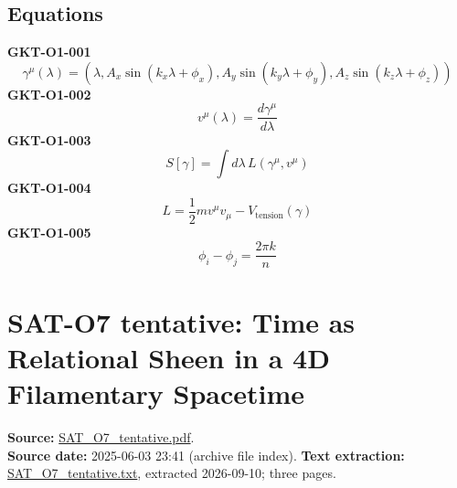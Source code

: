 \documentclass[10pt]{article}
\begin{document}
\subsection*{Equations}
\textbf{GKT-O1-001}
\begin{equation*}
\gamma^\mu(\lambda)=\left(\lambda, A_x\sin(k_x\lambda+\phi_x), A_y\sin(k_y\lambda+\phi_y), A_z\sin(k_z\lambda+\phi_z)\right)
\end{equation*}
\textbf{GKT-O1-002}
\begin{equation*}
v^\mu(\lambda)=\frac{d\gamma^\mu}{d\lambda}
\end{equation*}
\textbf{GKT-O1-003}
\begin{equation*}
S[\gamma]=\int d\lambda\,L(\gamma^\mu,v^\mu)
\end{equation*}
\textbf{GKT-O1-004}
\begin{equation*}
L=\frac{1}{2}m v^\mu v_\mu-V_{\text{tension}}(\gamma)
\end{equation*}
\textbf{GKT-O1-005}
\begin{equation*}
\phi_i-\phi_j=\frac{2\pi k}{n}
\end{equation*}

\clearpage
\section{SAT-O7 tentative: Time as Relational Sheen in a 4D Filamentary Spacetime}
\textbf{Source:} \href{https://github.com/Satobloc/SAT_THEORY_ARCHIVE_2023-25/blob/main/SAT_O7_tentative.pdf}{SAT\_O7\_tentative.pdf}.\\
\textbf{Source date:} 2025-06-03 23:41 (archive file index). \textbf{Text extraction:} \href{https://github.com/Satobloc/SAT_THEORY_ARCHIVE_2023-25/blob/main/_AUTO_EXTRACTED_TEXT/SAT_O7_tentative.txt}{SAT\_O7\_tentative.txt}, extracted 2026-09-10; three pages.
\end{document}

